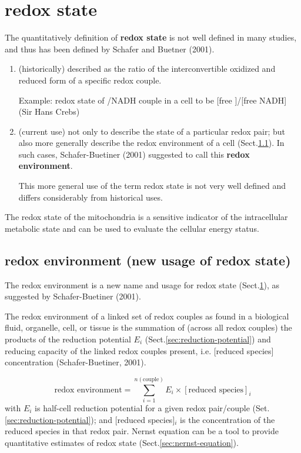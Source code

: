 \section{redox state}
\label{sec:redox-state}

The quantitatively definition of {\bf redox state} is not well defined in many
studies, and thus has been defined by Schafer and Buetner (2001).

\begin{enumerate}
  \item (historically) described as the ratio of the interconvertible oxidized
  and reduced form of a specific redox couple.

Example: redox state of /NADH couple in a cell to be
[free ]/[free NADH] (Sir Hans Crebs)

  \item (current use) not only to describe the state of a particular redox
  pair; but also more generally describe the redox environment of a cell
  (Sect.\ref{sec:redox-environment}). In such cases, Schafer-Buetiner (2001)
  suggested to call this {\bf redox environment}.

This more general use of the term redox state is not very well
defined and differs considerably from historical uses.

\end{enumerate}

The redox state of the mitochondria is a sensitive indicator of the
intracellular metabolic state and can be used to evaluate the cellular energy
status.

\subsection{redox environment (new usage of redox state)}
\label{sec:redox-environment}

The redox environment is a new name and usage for redox state
(Sect.\ref{sec:redox-state}), as suggested by Schafer-Buetiner (2001).

The redox environment of a linked set of redox couples as found in a biological
fluid, organelle, cell, or tissue is the summation of (across all redox couples)
the products of the reduction potential $E_i$
(Sect.\ref{sec:reduction-potential}) and reducing capacity of the linked redox
couples present, i.e. [reduced species] concentration (Schafer-Buetiner, 2001).

\begin{equation}
\text{redox environment} = \sum\limits_{i=1}^{n(\text{couple})} E_i \times
[\text{reduced species}]_i
\end{equation}
with $E_i$ is half-cell reduction potential for a given redox pair/couple
(Set.\ref{sec:reduction-potential}); and [reduced species]$_i$ is the concentration of
the reduced species in that redox pair.
Nernst equation can be a tool to provide quantitative estimates of redox
state (Sect.\ref{sec:nernst-equation}).

